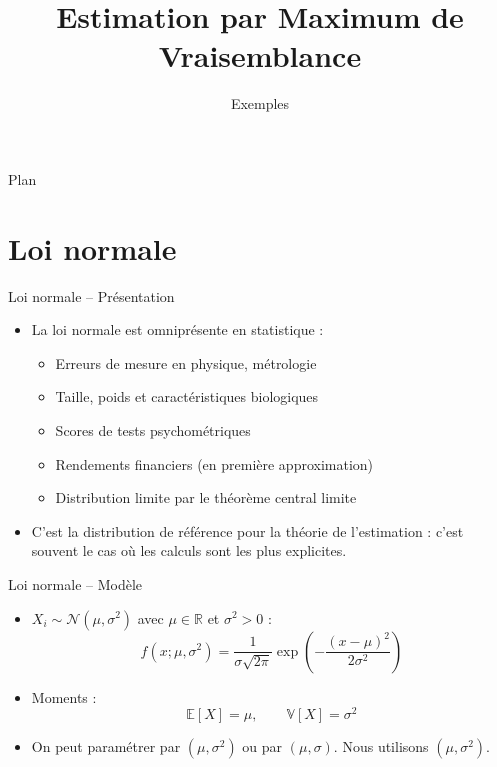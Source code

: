 \documentclass[11pt,aspectratio=169]{beamer}
\title{Estimation par Maximum de Vraisemblance}
\subtitle{Exemples}
\author{}
\date{}
\institute{}
\begin{document}
\begin{frame}
\titlepage
\end{frame}

\begin{frame}{Plan}
\tableofcontents
\end{frame}

\section{Loi normale}

\begin{frame}{Loi normale -- Présentation}

\begin{itemize}

\item La loi normale est omniprésente en statistique :\newline
  \begin{itemize}
    \item Erreurs de mesure en physique, métrologie\newline
    \item Taille, poids et caractéristiques biologiques\newline
    \item Scores de tests psychométriques\newline
    \item Rendements financiers (en première approximation)\newline
    \item Distribution limite par le théorème central limite\newline
  \end{itemize}

\item C'est la distribution de référence pour la théorie de l'estimation : c'est souvent le cas où les calculs sont les plus explicites.

\end{itemize}

\end{frame}

\begin{frame}{Loi normale -- Modèle}

\begin{itemize}

\item $X_i \sim \mathcal{N}(\mu, \sigma^2)$ avec $\mu \in \mathbb{R}$ et $\sigma^2 > 0$ :
  \[
  f(x; \mu, \sigma^2) = \frac{1}{\sigma\sqrt{2\pi}} \exp\left(-\frac{(x-\mu)^2}{2\sigma^2}\right)
  \]

\item Moments :
  \[
  \mathbb{E}[X] = \mu, \qquad \mathbb{V}[X] = \sigma^2
  \]

\item On peut paramétrer par $(\mu, \sigma^2)$ ou par $(\mu, \sigma)$. Nous utilisons $(\mu, \sigma^2)$.

\end{itemize}

\end{frame}
\end{document}
